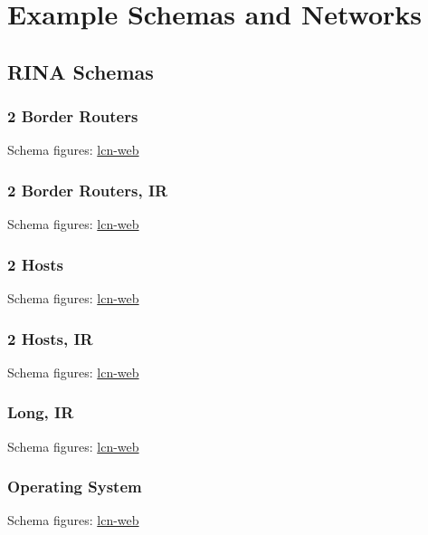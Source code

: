 \section{Example Schemas and Networks}
\label{sec:examples}


\subsection{RINA Schemas}

\subsubsection{2 Border Routers}
\label{sec:examples:rina:2br}
Schema figures: \href{https://vdmeer.github.io/skb/ipc/lcn-examples/rina/rina-2br/index.html}{lcn-web}



\subsubsection{2 Border Routers, IR}
\label{sec:examples:rina:2br-ir}
Schema figures: \href{https://vdmeer.github.io/skb/ipc/lcn-examples/rina/rina-2br-ir/index.html}{lcn-web}



\subsubsection{2 Hosts}
\label{sec:examples:rina:2h}
Schema figures: \href{https://vdmeer.github.io/skb/ipc/lcn-examples/rina/rina-2h/index.html}{lcn-web}



\subsubsection{2 Hosts, IR}
\label{sec:examples:rina:2h-ir}
Schema figures: \href{https://vdmeer.github.io/skb/ipc/lcn-examples/rina/rina-2h-ir/index.html}{lcn-web}



\subsubsection{Long, IR}
\label{sec:examples:rina:long-ir}
Schema figures: \href{https://vdmeer.github.io/skb/ipc/lcn-examples/rina/rina-long-ir/index.html}{lcn-web}



\subsubsection{Operating System}
\label{sec:examples:rina:os}
Schema figures: \href{https://vdmeer.github.io/skb/ipc/lcn-examples/rina/rina-os/index.html}{lcn-web}


